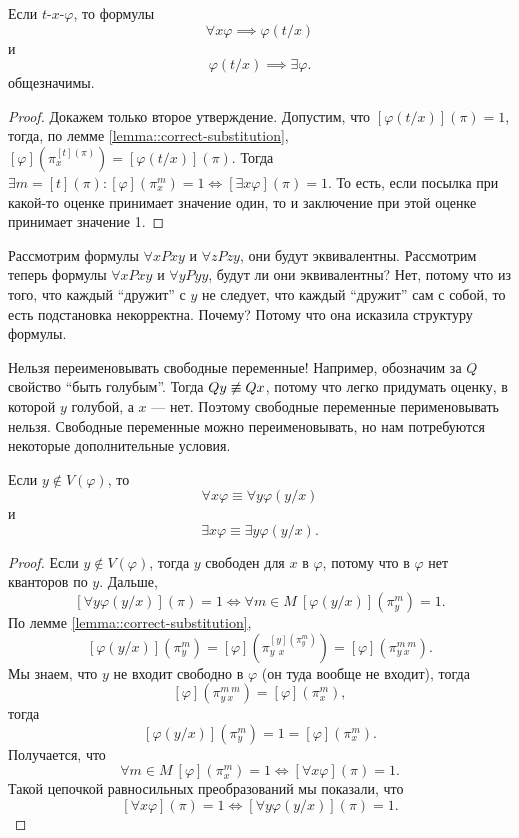 \begin{corollary}
    Если $t$-$x$-$\varphi$, то формулы
    $$
        \forall x \varphi \implies \varphi(t/x)
    $$
    и
    $$
        \varphi(t/x) \implies \exists \varphi.
    $$
    общезначимы.
\end{corollary}
\begin{proof}
    Докажем только второе утверждение.
    Допустим, что $[\varphi(t/x)](\pi) = 1$, тогда, по лемме \ref{lemma::correct-substitution}, $[\varphi](\pi_{x}^{[t](\pi)}) = [\varphi(t/x)](\pi)$.
    Тогда $\exists m = [t](\pi) \colon [\varphi](\pi_{x}^{m}) = 1 \iff [\exists x \varphi](\pi) = 1$.
    То есть, если посылка при какой-то оценке принимает значение один, то и заключение при этой оценке принимает значение 1.
\end{proof}

Рассмотрим формулы $\forall x Pxy$ и $\forall z Pzy$, они будут эквивалентны.
Рассмотрим теперь формулы $\forall x Pxy$ и $\forall y Pyy$, будут ли они эквивалентны?
Нет, потому что из того, что каждый \enquote{дружит} с $y$ не следует, что каждый \enquote{дружит} сам с собой, то есть подстановка некорректна.
Почему?
Потому что она исказила структуру формулы.

Нельзя переименовывать свободные переменные!
Например, обозначим за $Q$ свойство \enquote{быть голубым}.
Тогда $Qy \centernot \equiv Qx$, потому что легко придумать оценку, в которой $y$ голубой, а $x$ --- нет.
Поэтому свободные переменные перименовывать нельзя.
Свободные переменные можно переименовывать, но нам потребуются некоторые дополнительные условия.

\begin{corollary} \label{corollary::renaming-linked-variable}
    Если $y \notin V(\varphi)$, то
    $$
        \forall x \varphi \equiv \forall y \varphi(y/x)
    $$
    и
    $$
        \exists x \varphi \equiv \exists y \varphi(y/x).
    $$
\end{corollary}

\begin{proof}
    Если $y \notin V(\varphi)$, тогда $y$ свободен для $x$ в $\varphi$, потому что в $\varphi$ нет кванторов по $y$.
    Дальше,
    $$
        [\forall y \varphi(y/x)](\pi) = 1 \iff \forall m \in M~ [\varphi(y/x)](\pi_{y}^{m}) = 1.
    $$
    По лемме \ref{lemma::correct-substitution},
    $$
        [\varphi(y/x)](\pi_{y}^{m}) = [\varphi](\pi_{y~~x}^{[y](\pi_{y}^{m})}) = [\varphi](\pi_{y~x}^{m~m}).
    $$
    Мы знаем, что $y$ не входит свободно в $\varphi$ (он туда вообще не входит), тогда
    $$
        [\varphi](\pi_{y~x}^{m~m}) = [\varphi](\pi_{x}^{m}),
    $$
    тогда
    $$
        [\varphi(y/x)](\pi_{y}^{m}) = 1 = [\varphi](\pi_{x}^{m}).
    $$
    Получается, что
    $$
        \forall m \in M~ [\varphi](\pi_{x}^{m}) = 1 \iff [\forall x \varphi](\pi) = 1.
    $$
    Такой цепочкой равносильных преобразований мы показали, что
    $$
        [\forall x \varphi](\pi) = 1 \iff [\forall y \varphi(y/x)](\pi) = 1.
    $$
\end{proof}

